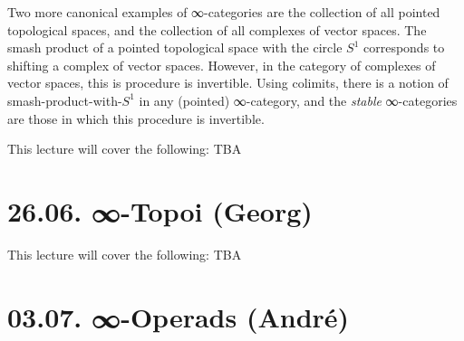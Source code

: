 \documentclass[a4paper]{amsart}
\numberwithin{figure}{section}
\theoremstyle{theorem}
\theoremstyle{definition}
\begin{document}
Two more canonical examples of ∞-categories are the collection of all pointed topological spaces, and the collection of all complexes of vector spaces. The smash product of a pointed topological space with the circle $S^1$ corresponds to shifting a complex of vector spaces. %
However, in the category of complexes of vector spaces, this is procedure is invertible. Using colimits, there is a notion of smash-product-with-$S^1$ in any (pointed) ∞-category, and the \emph{stable} ∞-categories are those in which this procedure is invertible.

This lecture will cover the following: TBA


%





\section{26.06. ∞-Topoi (Georg)}

This lecture will cover the following: TBA

% 

\section{03.07. ∞-Operads (André)}
\end{document}
